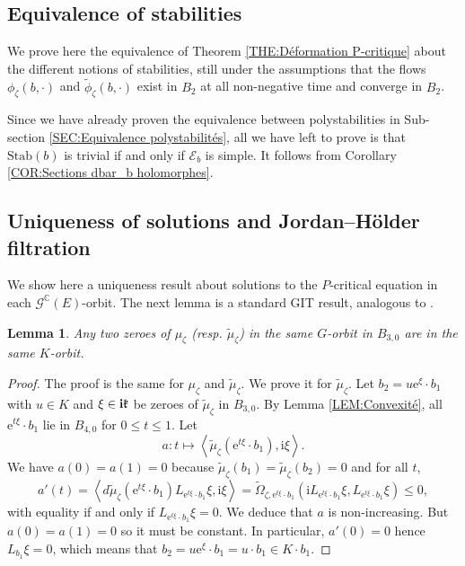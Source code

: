 \documentclass{article}
\newtheorem{lemma}[theorem]{Lemma}
\theoremstyle{remark}
\theoremstyle{definition}
\newcommand{\C}{\mathbb{C}}
\newcommand{\Stab}{\mathrm{Stab}}
\renewcommand{\i}{\boldsymbol{\mathrm{i}}}
\newcommand{\e}{\boldsymbol{\mathrm{e}}}
\newcommand{\scal}[2]{\left< #1,#2 \right>}
\newcommand{\E}{\mathcal{E}}
\newcommand{\G}{\mathcal{G}}
\renewcommand{\leq}{\leqslant}
\begin{document}
\subsection{Equivalence of stabilities}\label{SEC:Equivalence stabilités}

We prove here the equivalence of Theorem \ref{THE:Déformation P-critique} about the different notions of stabilities, still under the assumptions that the flows $\phi_\zeta(b,\cdot)$ and $\tilde{\phi}_\zeta(b,\cdot)$ exist in $B_2$ at all non-negative time and converge in $B_2$.

Since we have already proven the equivalence between polystabilities in Sub-section \ref{SEC:Equivalence polystabilités}, all we have left to prove is that $\Stab(b)$ is trivial if and only if $\E_b$ is simple. It follows from Corollary \ref{COR:Sections dbar_b holomorphes}.

\subsection{Uniqueness of solutions and Jordan--Hölder filtration}

We show here a uniqueness result about solutions to the $P$-critical equation in each $\G^\C(E)$-orbit. The next lemma is a standard GIT result, analogous to \cite[Lemma 2.1]{GRS}.

\begin{lemma}\label{LEM:Unicité K-orbite zéro mu_zeta}
    Any two zeroes of $\mu_\zeta$ (resp. $\tilde{\mu}_\zeta$) in the same $G$-orbit in $B_{3,0}$ are in the same $K$-orbit.
\end{lemma}
\begin{proof}
The proof is the same for $\mu_\zeta$ and $\tilde{\mu}_\zeta$. We prove it for $\tilde{\mu}_\zeta$. Let $b_2 = u\e^\xi \cdot b_1$ with $u \in K$ and $\xi \in \i\frak{k}$ be zeroes of $\tilde{\mu}_\zeta$ in $B_{3,0}$. By Lemma \ref{LEM:Convexité}, all $\e^{t\xi} \cdot b_1$ lie in $B_{4,0}$ for $0 \leq t \leq 1$. Let
$$
a : t \mapsto \scal{\tilde{\mu}_\zeta(\e^{t\xi} \cdot b_1)}{\i\xi}.
$$
We have $a(0) = a(1) = 0$ because $\tilde{\mu}_\zeta(b_1) = \tilde{\mu}_\zeta(b_2) = 0$ and for all $t$,
$$
a'(t) = \scal{d\tilde{\mu}_\zeta(\e^{t\xi} \cdot b_1)L_{\e^{t\xi} \cdot b_1}\xi}{\i\xi} = \tilde{\Omega}_{\zeta,\e^{t\xi} \cdot b_1}(\i L_{\e^{t\xi} \cdot b_1}\xi,L_{\e^{t\xi} \cdot b_1}\xi) \leq 0,
$$
with equality if and only if $L_{\e^{t\xi} \cdot b_1}\xi = 0$. We deduce that $a$ is non-increasing. But $a(0) = a(1) = 0$ so it must be constant. In particular, $a'(0) = 0$ hence $L_{b_1}\xi = 0$, which means that $b_2 = u\e^\xi \cdot b_1 = u \cdot b_1 \in K \cdot b_1$.
\end{proof}
\end{document}
